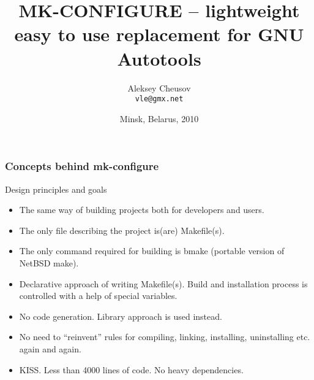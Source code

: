 \documentclass[hyperref={colorlinks=true}]{beamer}
\title{MK-CONFIGURE -- lightweight easy to use replacement for GNU Autotools}
\author{Aleksey Cheusov \\ \texttt{vle@gmx.net}}
\date{Minsk, Belarus, 2010}
\begin{document}

\newenvironment{Code}[1]%
               {\Verbatim[label=\bf{#1},frame=single,%
                   fontsize=\small,%
                   commandchars=\\\{\}]}%
               {\endVerbatim}

\newenvironment{CodeNoLabel}%
               {\Verbatim[frame=single,%
                   fontsize=\small,%
                   commandchars=\\\{\}]}%
               {\endVerbatim}

\newcommand{\prompt}[1]{\bf{#1}\textnormal{}}
\newcommand{\highlight}[1]{\bf{#1}\textnormal{}}
\newcommand{\URL}[1]{\textbf{#1}}
\newcommand{\AutohellFile}[1]{\textcolor{red}{#1}}
\newcommand{\MKCfile}[1]{\textcolor{green}{#1}}
\newcommand{\ModuleName}[1]{\textbf{#1}\textnormal{}}
\newcommand{\ProgName}[1]{\textbf{#1}\textnormal{}}
\newcommand{\ProjectName}[1]{\textbf{#1}\textnormal{}}
\newcommand{\PackageName}[1]{\textbf{#1}\textnormal{}}
\newcommand{\MKC}[1]{\large\textsf{#1}\textnormal{}\normalsize}


\begin{frame}
  \titlepage
\end{frame}

\begin{frame}
  \frametitle{Concepts behind mk-configure}
  \begin{block}{Design principles and goals}
    \begin{itemize}
    \item The same way of building projects both for developers and users.
    \item The only file describing the project is(are) Makefile(s).
    \item The only command
      required for building is bmake (portable version of NetBSD make).
    \item Declarative approach of writing Makefile(s). Build and
      installation process is controlled with a help of special
      variables.
    \item No code generation. Library approach is used instead.
    \item No need to ``reinvent'' rules for compiling, linking,
      installing, uninstalling etc. again and again.
    \item KISS. Less than 4000 lines of code.
      No heavy dependencies.
    \end{itemize}
  \end{block}
\end{frame}
\end{document}
